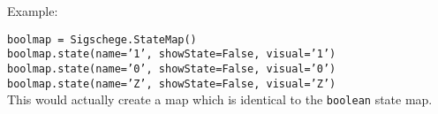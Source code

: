 \documentclass[11pt]{article}
\begin{document}
Example:

\texttt{boolmap = Sigschege.StateMap()}\\
\texttt{boolmap.state(name='1', showState=False, visual='1')}\\
\texttt{boolmap.state(name='0', showState=False, visual='0')}\\
\texttt{boolmap.state(name='Z', showState=False, visual='Z')}\\

This would actually create a map which is identical to the \texttt{boolean}
state map.
\end{document}
